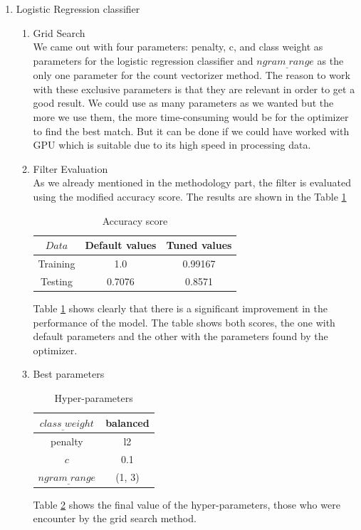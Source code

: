 \documentclass[journal]{IEEEtran}
\begin{document}
\begin{enumerate}

\item Logistic Regression classifier
\begin{enumerate}
\item Grid Search\\
We came out with four parameters: penalty, c, and class weight as parameters for the logistic regression classifier and $ngram_{\_}range$ as the only one parameter for the count vectorizer method. The reason to work with these exclusive parameters is that they are relevant in order to get a good result. We could use as many parameters as we wanted but the more we use them, the more time-consuming would be for the optimizer to find the best match. But it can be done if we could have worked with GPU which is suitable due to its high speed in processing data.  
 
\item Filter Evaluation\\
As we already mentioned in the methodology part, the filter is evaluated using the modified accuracy score. The results are shown in the Table \ref{temp0}

\begin{table}[ht]
\renewcommand{\arraystretch}{1.3}
\centering
\begin{tabular}{|c|c|c|}
\hline
$ Data$ & Default values & Tuned values\\
\hline
Training & 1.0 & 0.99167\\
\hline
Testing & 0.7076 & 0.8571\\
\hline
\end{tabular}
\caption{Accuracy score}
\label{temp0}
\end{table}
Table \ref{temp0} shows clearly that there is a significant improvement in the performance of the model. The table shows both scores, the one with default parameters and the other with the parameters found by the optimizer.

\item Best parameters

\begin{table}[ht]
\renewcommand{\arraystretch}{1.3}
\centering
\begin{tabular}{|c|c|}
\hline
$class_{\_}weight$ &  balanced\\
\hline
penalty & l2\\
\hline
$c$ & 0.1 \\
\hline
$ngram_{\_}range$ & (1, 3) \\
\hline
\end{tabular}
\caption{Hyper-parameters}
\label{temp2}
\end{table}
Table \ref{temp2} shows the final value of the hyper-parameters, those who were encounter by the grid search method.


\end{enumerate}
\end{enumerate}
\end{document}
